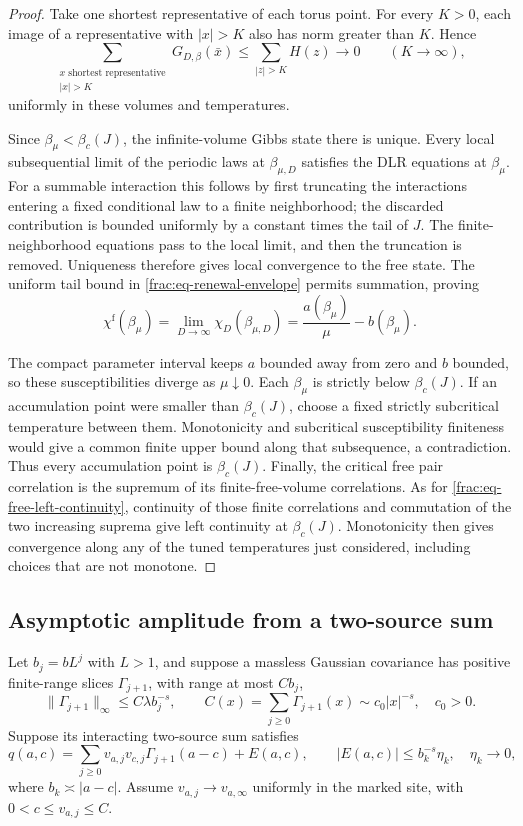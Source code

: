 \documentclass[11pt]{article}
\begin{document}
\begin{proof}
Take one shortest representative of each torus point. For every
\(K>0\), each image of a representative with \(|x|>K\) also
has norm greater than \(K\). Hence
\[
 \sum_{\substack{x\text{ shortest representative}\\|x|>K}}
       G_{D,\beta}(\bar x)
 \le\sum_{|z|>K}H(z)\longrightarrow0
       \qquad(K\to\infty),
\]
uniformly in these volumes and temperatures.

Since \(\beta_\mu<\beta_c(J)\), the infinite-volume Gibbs state
there is unique. Every local subsequential limit of the periodic
laws at \(\beta_{\mu,D}\) satisfies the DLR equations at
\(\beta_\mu\). For a summable interaction this follows by
first truncating the interactions entering a fixed conditional
law to a finite neighborhood; the discarded contribution is
bounded uniformly by a constant times the tail of \(J\).
The finite-neighborhood equations pass to the local limit, and
then the truncation is removed. Uniqueness therefore gives
local convergence to the free state. The uniform tail bound in
\eqref{frac:eq-renewal-envelope} permits summation, proving
\[
 \chi^{\mathrm f}(\beta_\mu)
 =\lim_{D\to\infty}\chi_D(\beta_{\mu,D})
 =\frac{a(\beta_\mu)}{\mu}-b(\beta_\mu).
\]

The compact parameter interval keeps \(a\) bounded away from
zero and \(b\) bounded, so these susceptibilities diverge as
\(\mu\downarrow0\). Each \(\beta_\mu\) is strictly below
\(\beta_c(J)\). If an accumulation point were smaller than
\(\beta_c(J)\), choose a fixed strictly subcritical temperature
between them. Monotonicity and subcritical susceptibility
finiteness would give a common finite upper bound along that
subsequence, a contradiction. Thus every accumulation point
is \(\beta_c(J)\).
Finally, the critical free pair correlation is the supremum
of its finite-free-volume correlations. As for
\eqref{frac:eq-free-left-continuity}, continuity of those finite
correlations and commutation of the two increasing suprema give
left continuity at \(\beta_c(J)\). Monotonicity then gives
convergence along any of the tuned temperatures just considered,
including choices that are not monotone.
\end{proof}

\subsection{Asymptotic amplitude from a two-source sum}
\label{frac:sec:observables}
Let \(b_j=bL^j\) with \(L>1\), and suppose a massless Gaussian
covariance has positive finite-range slices \(\Gamma_{j+1}\), with range at most \(Cb_j\),
\[
 \|\Gamma_{j+1}\|_\infty\le C\lambda b_j^{-s},
 \qquad C(x)=\sum_{j\ge0}\Gamma_{j+1}(x)
                   \sim c_0|x|^{-s},\quad c_0>0.
\]
Suppose its interacting two-source sum satisfies
\begin{equation}\label{frac:eq:source-input}
 q(a,c)=\sum_{j\ge0}v_{a,j}v_{c,j}\Gamma_{j+1}(a-c)+E(a,c),
 \qquad |E(a,c)|\le b_k^{-s}\eta_k,
 \quad \eta_k\longrightarrow0,
\end{equation}
where \(b_k\asymp|a-c|\). Assume
\(v_{a,j}\to v_{a,\infty}\) uniformly in the marked site, with
\(0<c\le v_{a,j}\le C\). 
\end{document}
